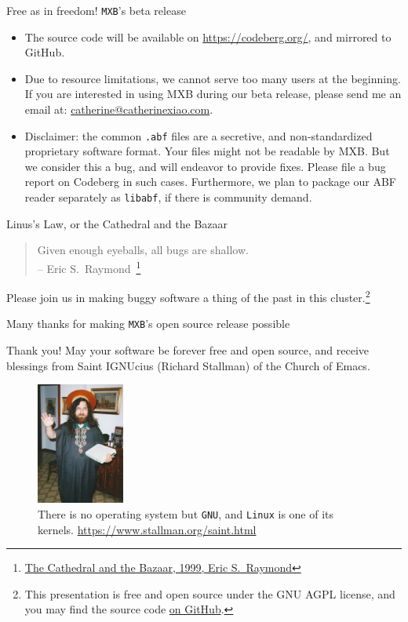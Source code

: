 \documentclass{beamer}
\begin{document}
\begin{frame}{Free as in freedom! \texttt{MXB}'s beta release}
    \begin{itemize}
        \item The source code will be available on \url{https://codeberg.org/}, and mirrored to GitHub.
        \item Due to resource limitations, we cannot serve too many users at the beginning. If you are interested in using MXB during our beta release, please send me an email at: \href{mailto:catherine@catherinexiao.com}{catherine@catherinexiao.com}.
        \item Disclaimer: the common \texttt{.abf} files are a secretive, and non-standardized proprietary software format. Your files might not be readable by MXB. But we consider this a bug, and will endeavor to provide fixes. Please file a bug report on Codeberg in such cases. Furthermore, we plan to package our ABF reader separately as \texttt{libabf}, if there is community demand.
    \end{itemize}
\end{frame}

\begin{frame}{Linus's Law, or the Cathedral and the Bazaar}
    \begin{quotation}
        Given enough eyeballs, all bugs are shallow.\\
        -- Eric S.~Raymond~\footnote{\href{http://www.catb.org/~esr/writings/cathedral-bazaar/}{The Cathedral and the Bazaar, 1999, Eric S.~Raymond}}
    \end{quotation}

    Please join us in making buggy software a thing of the past in this cluster.\footnote{This presentation is free and open source under the GNU AGPL license, and you may find the source code \href{https://github.com/cathxiao/presentation-nanodiag-2025}{on GitHub}.}
\end{frame}

\begin{frame}{Many thanks for making \texttt{MXB}'s open source release possible}
    \pause
    \begin{block}{Thank you! May your software be forever free and open source, and receive blessings from Saint IGNUcius (Richard Stallman) of the Church of Emacs.}
        \begin{figure}
            \includegraphics[height=4cm]{assets/saintignucius.jpg}
            \caption{There is no operating system but \texttt{GNU}, and \texttt{Linux} is one of its kernels.
            \href{https://www.stallman.org/saint.html}{https://www.stallman.org/saint.html}}
        \end{figure}
    \end{block}
    
\end{frame}
\end{document}
